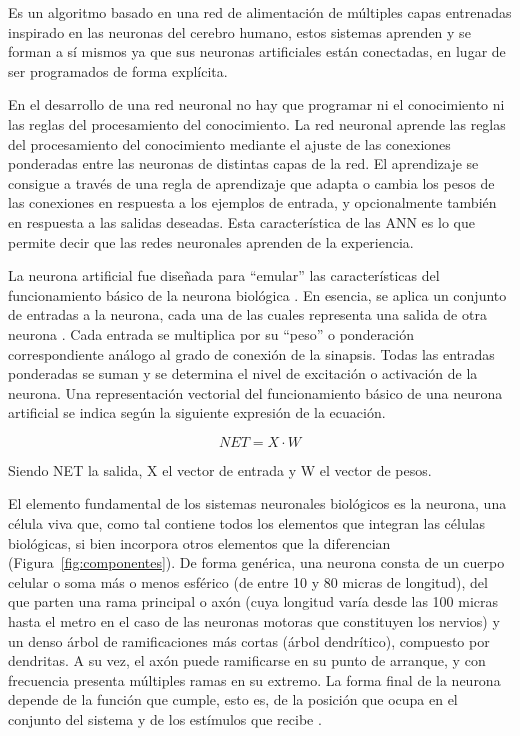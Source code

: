 Es un algoritmo basado en una red de alimentación de múltiples capas entrenadas inspirado en las neuronas del cerebro humano, estos sistemas aprenden y se forman a sí mismos ya que sus neuronas artificiales están conectadas, en lugar de ser programados de forma explícita\cite{herrera2020prediccion }.

\vspace{1\baselineskip}
En el desarrollo de una red neuronal no hay que programar ni el conocimiento ni las reglas del procesamiento del conocimiento. La red neuronal aprende las reglas del procesamiento del conocimiento mediante el ajuste de las conexiones ponderadas entre las neuronas de distintas capas de la red.
El aprendizaje se consigue a través de una regla de aprendizaje que adapta o cambia los pesos de las conexiones en respuesta a los ejemplos de entrada, y opcionalmente también en respuesta a las salidas deseadas. Esta característica de las ANN es lo que permite decir que las redes neuronales aprenden de la experiencia\cite{olabe1998redes}. 

\vspace{1\baselineskip}
La neurona artificial fue diseñada para “emular” las características del funcionamiento básico de la neurona biológica \cite{basogain2008redes}. En esencia, se aplica un conjunto de entradas a la neurona, cada una de las cuales representa una salida de otra neurona . Cada entrada se multiplica por su “peso” o ponderación correspondiente análogo al grado de conexión de la sinapsis. Todas las entradas ponderadas se suman y se determina el nivel de excitación o activación de la neurona. Una representación vectorial del funcionamiento
básico de una neurona artificial se indica según la siguiente expresión de la ecuación.

\[
NET = X \cdot W
\]

Siendo NET la salida, X el vector de entrada y W el vector de pesos. 

\vspace{1\baselineskip}
El elemento fundamental de los sistemas neuronales biológicos es la neurona, una célula viva que, como tal contiene todos los elementos que integran las células biológicas, si bien incorpora otros elementos que la diferencian (Figura~\ref{fig:componentes}). De forma genérica, una neurona consta de un cuerpo celular o soma más o menos esférico (de entre 10 y 80 micras de longitud), del que parten una rama principal o axón (cuya longitud varía desde las 100 micras hasta el metro en el caso de las neuronas motoras que constituyen los nervios) y un denso árbol de ramificaciones más cortas (árbol dendrítico), compuesto por dendritas. A su vez, el axón puede ramificarse en su punto de arranque, y con frecuencia presenta múltiples ramas en su extremo. La forma final de la neurona depende de la función que cumple, esto es, de la posición que ocupa en el conjunto del sistema y de los estímulos que recibe \cite{lopez2008redes}.

